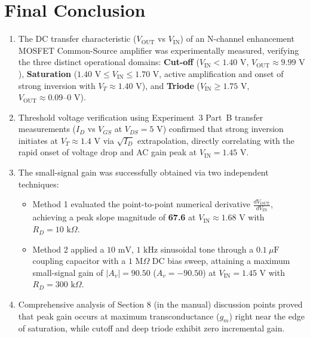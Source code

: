 \documentclass[11pt,a4paper]{article}
\begin{document}
\section{Final Conclusion}
\begin{enumerate}
    \item The DC transfer characteristic ($V_{\text{OUT}}$ vs $V_{\text{IN}}$) of an N-channel enhancement MOSFET Common-Source amplifier was experimentally measured, verifying the three distinct operational domains: \textbf{Cut-off} ($V_{\text{IN}} < 1.40\text{ V}$, $V_{\text{OUT}} \approx 9.99\text{ V}$), \textbf{Saturation} ($1.40\text{ V} \le V_{\text{IN}} \le 1.70\text{ V}$, active amplification and onset of strong inversion with $V_T \approx 1.40\text{ V}$), and \textbf{Triode} ($V_{\text{IN}} \ge 1.75\text{ V}$, $V_{\text{OUT}} \approx 0.09\text{--}0\text{ V}$).
    \item Threshold voltage verification using Experiment~3 Part~B transfer measurements ($I_D$ vs $V_{GS}$ at $V_{DS} = 5\text{ V}$) confirmed that strong inversion initiates at $V_T \approx 1.4\text{ V}$ via $\sqrt{I_D}$ extrapolation, directly correlating with the rapid onset of voltage drop and AC gain peak at $V_{\text{IN}} = 1.45\text{ V}$.
    \item The small-signal gain was successfully obtained via two independent techniques:
    \begin{itemize}
        \item Method 1 evaluated the point-to-point numerical derivative $\frac{dV_{\text{OUT}}}{dV_{\text{IN}}}$, achieving a peak slope magnitude of \textbf{67.6} at $V_{\text{IN}} \approx 1.68\text{ V}$ with $R_D = 10\text{ k}\Omega$.
        \item Method 2 applied a $10\text{ mV}$, $1\text{ kHz}$ sinusoidal tone through a $0.1\ \mu\text{F}$ coupling capacitor with a $1\text{ M}\Omega$ DC bias sweep, attaining a maximum small-signal gain of \textbf{$|A_v| = 90.50$} ($A_v = -90.50$) at $V_{\text{IN}} = 1.45\text{ V}$ with $R_D = 300\text{ k}\Omega$.
    \end{itemize}
    \item Comprehensive analysis of Section 8 (in the manual) discussion points proved that peak gain occurs at maximum transconductance ($g_m$) right near the edge of saturation, while cutoff and deep triode exhibit zero incremental gain.
\end{enumerate}
\end{document}
